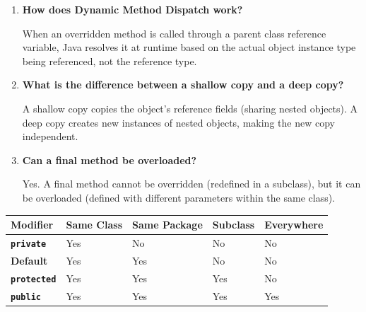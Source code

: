 \documentclass[12pt,a4paper]{article}
\newcommand{\Q}[1]{\textbf{#1}\par\noindent\ignorespaces}
\renewcommand{\arraystretch}{1.45}
\begin{document}
\begin{tcolorbox}[exambox, title={\textbf{Frequently Asked / Viva Questions}}]
\begin{enumerate}[leftmargin=*, label=\textbf{Q\arabic*.}, itemsep=5pt]
  \item \Q{How does Dynamic Method Dispatch work?}
        When an overridden method is called through a parent class reference variable, Java resolves it at runtime based on the actual object instance type being referenced, not the reference type.
        
  \item \Q{What is the difference between a shallow copy and a deep copy?}
        A shallow copy copies the object's reference fields (sharing nested objects). A deep copy creates new instances of nested objects, making the new copy independent.
        
  \item \Q{Can a final method be overloaded?}
        Yes. A final method cannot be overridden (redefined in a subclass), but it can be overloaded (defined with different parameters within the same class).
\end{enumerate}
\end{tcolorbox}

\begin{tcolorbox}[tikzbox, title={Java Access Modifier Visibility Matrix}]
\centering
{\renewcommand{\arraystretch}{1.45}%
\begin{tabularx}{\linewidth}{|B{2.8cm}|>{\centering\arraybackslash}X|>{\centering\arraybackslash}X|>{\centering\arraybackslash}X|>{\centering\arraybackslash}X|}
\hline
\textbf{Modifier} & \textbf{Same Class} & \textbf{Same Package} & \textbf{Subclass} & \textbf{Everywhere} \\
\hline
\textbf{\texttt{private}} & Yes & No & No & No \\
\hline
\textbf{Default} & Yes & Yes & No & No \\
\hline
\textbf{\texttt{protected}} & Yes & Yes & Yes & No \\
\hline
\textbf{\texttt{public}} & Yes & Yes & Yes & Yes \\
\hline
\end{tabularx}}
\end{tcolorbox}
\end{document}
